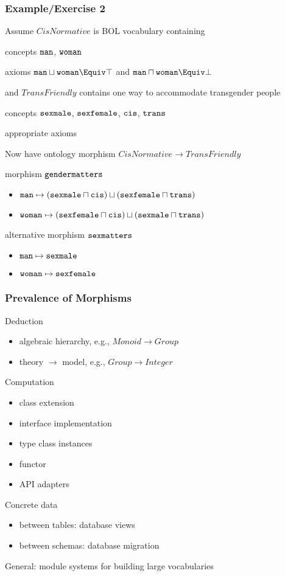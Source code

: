 \begin{frame}[fragile]\frametitle{Example/Exercise 2}
\begin{blockitems}{Assume $CisNormative$ is BOL vocabulary containing}
\item concepts $\cn{man}$, $\cn{woman}$
\item axioms $\cn{man}\sqcup\cn{woman}\Equiv \top$ and $\cn{man}\sqcap\cn{woman}\Equiv \bot$
\end{blockitems}

\begin{blockitems}{and $TransFriendly$ contains \hfill\small one way to accommodate transgender people}
\item concepts $\cn{sexmale}$, $\cn{sexfemale}$, $\cn{cis}$, $\cn{trans}$
\item appropriate axioms
\end{blockitems}

\begin{blockitems}{Now have ontology morphism $CisNormative \to TransFriendly$}
\item morphism $\cn{gendermatters}$
 \begin{itemize}
 \item $\cn{man}\mapsto (\cn{sexmale}\sqcap\cn{cis})\sqcup (\cn{sexfemale}\sqcap\cn{trans})$
 \item $\cn{woman}\mapsto (\cn{sexfemale}\sqcap\cn{cis})\sqcup (\cn{sexmale}\sqcap\cn{trans})$
 \end{itemize}
\item alternative morphism $\cn{sexmatters}$
 \begin{itemize}
 \item $\cn{man}\mapsto \cn{sexmale}$
 \item $\cn{woman}\mapsto \cn{sexfemale}$
 \end{itemize}
\end{blockitems}
\end{frame}

\begin{frame}\frametitle{Prevalence of Morphisms}
Deduction
\begin{itemize}
\item algebraic hierarchy, e.g., $Monoid\to Group$
\item theory $\to$ model, e.g., $Group\to Integer$
\end{itemize}
Computation
\begin{itemize}
\item class extension
\item interface implementation
\item type class instances
\item functor
\item API adapters
\end{itemize}
Concrete data
\begin{itemize}
\item between tables: database views
\item between schemas: database migration
\end{itemize}

General: module systems for building large vocabularies
\end{frame}
